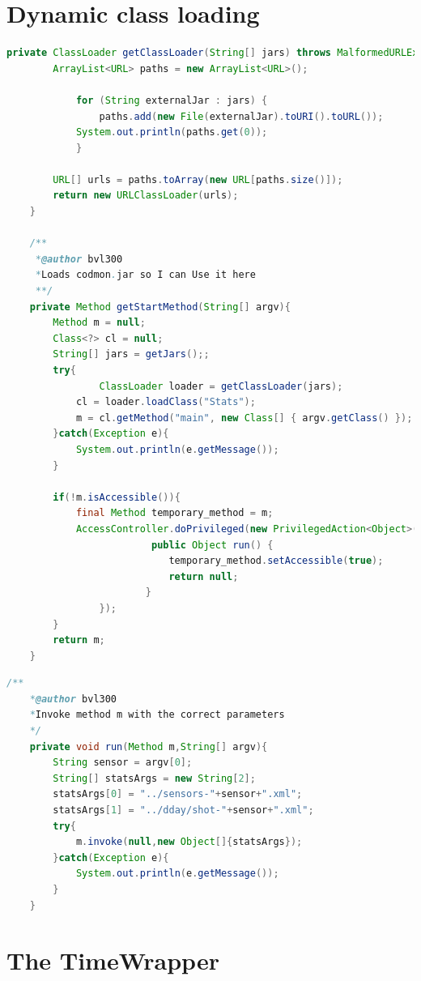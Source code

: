 \documentclass{article}
\begin{document}
\section{Dynamic class loading}
\label{AppendixA}

\begin{lstlisting}[frame=single ,language=Java]
private ClassLoader getClassLoader(String[] jars) throws MalformedURLException, SecurityException{
		ArrayList<URL> paths = new ArrayList<URL>();

     		for (String externalJar : jars) {
         		paths.add(new File(externalJar).toURI().toURL());
			System.out.println(paths.get(0));
     		}
     		
		URL[] urls = paths.toArray(new URL[paths.size()]);
		return new URLClassLoader(urls);
	}	

	/**
	 *@author bvl300
	 *Loads codmon.jar so I can Use it here
	 **/
	private Method getStartMethod(String[] argv){	
		Method m = null;
		Class<?> cl = null;
		String[] jars = getJars();;
		try{
		        ClassLoader loader = getClassLoader(jars);
			cl = loader.loadClass("Stats");
			m = cl.getMethod("main", new Class[] { argv.getClass() });
		}catch(Exception e){
			System.out.println(e.getMessage());
		}

		if(!m.isAccessible()){
			final Method temporary_method = m;
			AccessController.doPrivileged(new PrivilegedAction<Object>() {
            			 public Object run() {
               		  		temporary_method.setAccessible(true);
                 			return null;
             			}
         		});
		}
		return m;
	} 
\end{lstlisting} 
\newpage
{}
\begin{lstlisting}[frame=single ,language=Java]
	/**
 	*@author bvl300
 	*Invoke method m with the correct parameters
 	*/ 
	private void run(Method m,String[] argv){
		String sensor = argv[0];
		String[] statsArgs = new String[2];
		statsArgs[0] = "../sensors-"+sensor+".xml";
		statsArgs[1] = "../dday/shot-"+sensor+".xml";
		try{
			m.invoke(null,new Object[]{statsArgs});
		}catch(Exception e){
			System.out.println(e.getMessage());
		}
	}
\end{lstlisting}  

\newpage
\section{The TimeWrapper}
\label{AppendixB}
\end{document}
